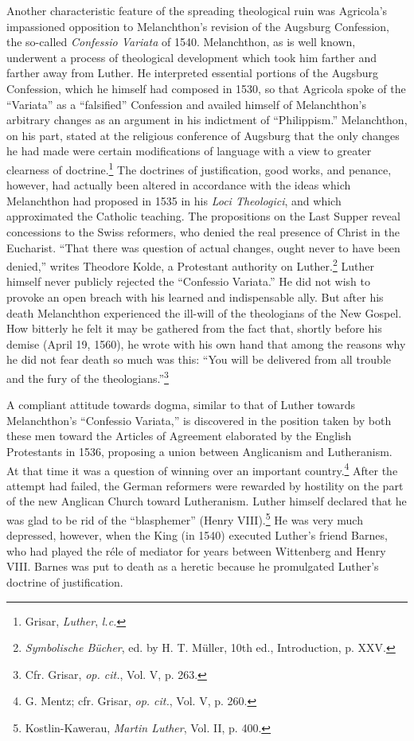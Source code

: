 Another characteristic feature of the spreading theological ruin
was Agricola’s impassioned opposition to Melanchthon’s revision of
the Augsburg Confession, the so-called \textit{Confessio Variata} of 1540.
Melanchthon, as is well known, underwent a process of theological
development which took him farther and farther away from Luther.
He interpreted essential portions of the Augsburg Confession, which
he himself had composed in 1530, so that Agricola spoke of the “Variata”
as a “falsified” Confession and availed himself of Melanchthon’s
arbitrary changes as an argument in his indictment of “Philippism.”
Melanchthon, on his part, stated at the religious conference of Augsburg
that the only changes he had made were certain modifications
of language with a view to greater clearness of doctrine.\footnote{Grisar, \textit{Luther}, \textit{l.c.}}
 The doctrines
of justification, good works, and penance, however, had actually been
altered in accordance with the ideas which Melanchthon
had proposed in 1535 in his \textit{Loci Theologici}, and which approximated
the Catholic teaching. The propositions on the Last Supper reveal
concessions to the Swiss reformers, who denied the real presence of
Christ in the Eucharist. “That there was question of actual changes,
ought never to have been denied,” writes Theodore Kolde, a Protestant
authority on Luther.\footnote{\textit{Symbolische Bücher}, ed. by H. T. Müller, 10th ed., Introduction, p. XXV.}
Luther himself never publicly rejected
the “Confessio Variata.” He did not wish to provoke an open breach
with his learned and indispensable ally. But after his death Melanchthon
experienced the ill-will of the theologians of the New Gospel.
How bitterly he felt it may be gathered from the fact that, shortly
before his demise (April 19, 1560), he wrote with his own hand that
among the reasons why he did not fear death so much was this: “You
will be delivered from all trouble and the fury of the theologians.”\footnote{Cfr. Grisar, \textit{op. cit.}, Vol. V, p. 263.}

A compliant attitude towards dogma, similar to that of Luther
towards Melanchthon’s “Confessio Variata,” is discovered in the position
taken by both these men toward the Articles of Agreement
elaborated by the English Protestants in 1536, proposing a union between
Anglicanism and Lutheranism. At that time it was a question
of winning over an important country.\footnote{G. Mentz; cfr. Grisar, \textit{op. cit.}, Vol. V, p. 260.}
 After the attempt had
failed, the German reformers were rewarded by hostility on the part
of the new Anglican Church toward Lutheranism. Luther himself
declared that he was glad to be rid of the “blasphemer” (Henry
VIII).\footnote{Kostlin-Kawerau, \textit{Martin Luther}, Vol. II, p. 400.}
 He was very much depressed, however, when the King (in
1540) executed Luther’s friend Barnes, who had played the réle of
mediator for years between Wittenberg and Henry VIII. Barnes was
put to death as a heretic because he promulgated Luther’s doctrine
of justification.

